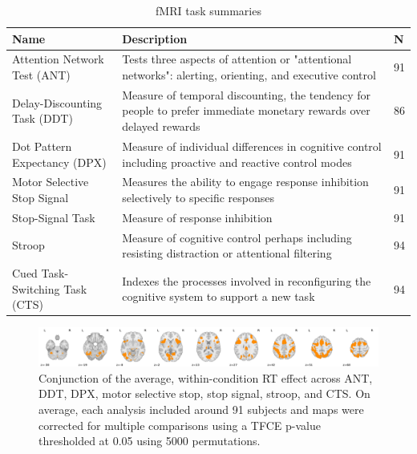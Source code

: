 \documentclass[titlepage,12pt] {article}
\begin{document}
\begin{table}[h!]
  \begin{center}
    \begin{tabular}{|L{6cm}|L{7cm}|L{1cm}|}\hline
   \textbf{Name} & \textbf{Description} & \textbf{N} \\ \hline\hline
   Attention Network Test (ANT) &  Tests three aspects of attention or  "attentional networks": alerting, orienting, and executive control & 91 \\ \hline
    Delay-Discounting Task (DDT) & Measure of temporal discounting, the tendency for people to prefer immediate monetary rewards over delayed rewards & 86 \\ \hline
   Dot Pattern Expectancy (DPX) & Measure of individual differences in cognitive control including proactive and reactive control modes & 91 \\ \hline
   Motor Selective Stop Signal & Measures the ability to engage response inhibition selectively to specific responses & 91 \\ \hline
   Stop-Signal Task & Measure of response inhibition & 91 \\ \hline
   Stroop & Measure of cognitive control perhaps including resisting distraction or attentional filtering & 94 \\ \hline
   Cued Task-Switching Task (CTS) & Indexes the processes involved in reconfiguring the cognitive system to support a new task & 94 \\ \hline
    \end{tabular}
    \caption{fMRI task summaries}
    \label{tab:task_summaries}
   \end{center}
 \end{table}

\begin{figure}
  \centering
   \includegraphics[width=6.5in]{Figures/conjunction_avg_rt_effect_across_7tasks.pdf}
   \caption{Conjunction of the average, within-condition RT effect across ANT, DDT, DPX, motor selective stop, stop signal, stroop, and CTS.  On average, each analysis included around 91 subjects and maps were corrected for multiple comparisons using a TFCE p-value thresholded at 0.05 using 5000 permutations.}
  \label{fig:conj}
\end{figure}


\end{document}
